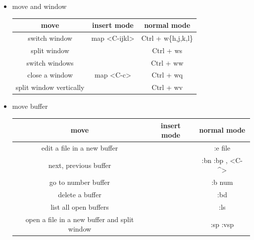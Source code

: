 \documentclass[a4paper,12pt,twoside]{book}
\begin{document}
\begin{itemize}
\begin{center}
\begin{tabular}{c|c|c}
		
				\end{tabular}
	\end{center}



\item move and window

\begin{center}
   
  \begin{tabular}{c|c|c}
   \hline
		move & insert mode & normal mode \\
		
\hline 
		switch window & map <C-ijkl> &  Ctrl + w\{h,j,k,l\}\\
				
		\hline 
		split window &  &  Ctrl + ws\\
		
		\hline 
		switch windows &  & Ctrl + ww\\
		
		\hline 
		close a window & map <C-c> & Ctrl + wq\\
		
		\hline
		split window vertically	& & Ctrl + wv \\
		
			\end{tabular}
	\end{center}

\item move  buffer



\begin{center}
  \begin{tabular}{c|c|c}
   \hline
		move & insert mode & normal mode \\
		
\hline 
		edit a file in a new buffer & &  :e file\\
				
		\hline 
		next, previous buffer & &  :bn :bp , <C-^>\\
		
\hline 
		go to number buffer & &  :b num \\		
		
		\hline 
		delete a buffer & & :bd \\
		
		\hline 
		list all open buffers & & :ls\\
		
		\hline
		open a file in a new buffer and split window
	 & & :sp :vsp \\
		

\end{tabular}
\end{center}
\end{itemize}
\end{document}

